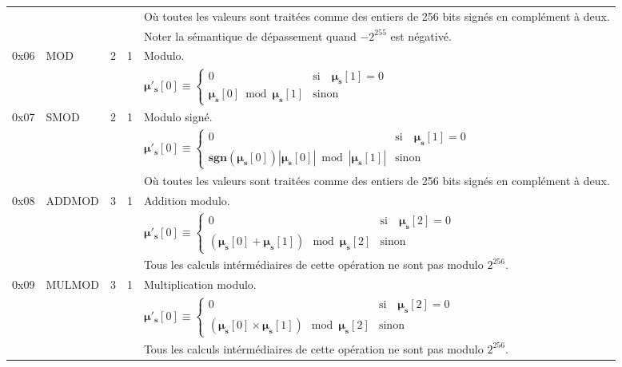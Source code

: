 \documentclass[9pt,oneside]{amsart}
\begin{document}
\begin{tabular*}{\columnwidth}[h]{rlrrl}
&&&& Où toutes les valeurs sont traitées comme des entiers de 256 bits signés en complément à deux. \\
&&&& Noter la sémantique de dépassement quand $-2^{255}$ est négativé.\\
\midrule
0x06 & {\small MOD} & 2 & 1 & Modulo. \\
&&&& $\boldsymbol{\mu}'_\mathbf{s}[0] \equiv \begin{cases}0 & \text{si} \quad \boldsymbol{\mu}_\mathbf{s}[1] = 0\\ \boldsymbol{\mu}_\mathbf{s}[0] \bmod \boldsymbol{\mu}_\mathbf{s}[1] & \text{sinon}\end{cases}$  \\
\midrule
0x07 & {\small SMOD} & 2 & 1 & Modulo signé. \\
&&&& $\boldsymbol{\mu}'_\mathbf{s}[0] \equiv \begin{cases}0 & \text{si} \quad \boldsymbol{\mu}_\mathbf{s}[1] = 0\\ \mathbf{sgn} (\boldsymbol{\mu}_\mathbf{s}[0]) |\boldsymbol{\mu}_\mathbf{s}[0]| \bmod |\boldsymbol{\mu}_\mathbf{s}[1]| & \text{sinon}\end{cases}$  \\
&&&& Où toutes les valeurs sont traitées comme des entiers de 256 bits signés en complément à deux. \\
\midrule
0x08 & {\small ADDMOD} & 3 & 1 & Addition modulo. \\
&&&& $\boldsymbol{\mu}'_\mathbf{s}[0] \equiv \begin{cases}0 & \text{si} \quad \boldsymbol{\mu}_\mathbf{s}[2] = 0\\ (\boldsymbol{\mu}_\mathbf{s}[0] + \boldsymbol{\mu}_\mathbf{s}[1]) \mod \boldsymbol{\mu}_\mathbf{s}[2] & \text{sinon}\end{cases}$  \\
&&&& Tous les calculs intérmédiaires de cette opération ne sont pas modulo $2^{256}$. \\
\midrule
0x09 & {\small MULMOD} & 3 & 1 & Multiplication modulo. \\
&&&& $\boldsymbol{\mu}'_\mathbf{s}[0] \equiv \begin{cases}0 & \text{si} \quad \boldsymbol{\mu}_\mathbf{s}[2] = 0\\ (\boldsymbol{\mu}_\mathbf{s}[0] \times \boldsymbol{\mu}_\mathbf{s}[1]) \mod \boldsymbol{\mu}_\mathbf{s}[2] & \text{sinon}\end{cases}$  \\
&&&& Tous les calculs intérmédiaires de cette opération ne sont pas modulo $2^{256}$. \\

\end{tabular*}
\end{document}
